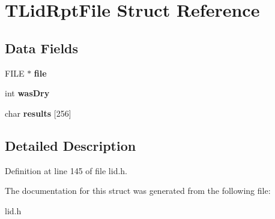 \hypertarget{struct_t_lid_rpt_file}{}\section{T\+Lid\+Rpt\+File Struct Reference}
\label{struct_t_lid_rpt_file}
\subsection*{Data Fields}
\begin{DoxyCompactItemize}
\item 
\mbox{\label{struct_t_lid_rpt_file_a702945180aa732857b380a007a7e2a21}} 
F\+I\+LE $\ast$ {\bfseries file}
\item 
\mbox{\label{struct_t_lid_rpt_file_acf0a95f57a0bba78d1f73609c7b7dbe2}} 
int {\bfseries was\+Dry}
\item 
\mbox{\label{struct_t_lid_rpt_file_a8959b1c3c9882154751d0b0fea047021}} 
char {\bfseries results} \mbox{[}256\mbox{]}
\end{DoxyCompactItemize}


\subsection{Detailed Description}


Definition at line 145 of file lid.\+h.



The documentation for this struct was generated from the following file\+:\begin{DoxyCompactItemize}
\item 
lid.\+h\end{DoxyCompactItemize}
